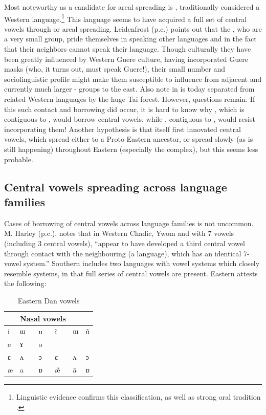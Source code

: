 \documentclass[output=paper,newtxmath,modfonts,nonflat,draft]{langsci/langscibook}
\begin{document}
Most noteworthy as a candidate for areal spreading is , traditionally considered a Western  language.\footnote{Linguistic evidence confirms this classification, as well as strong oral tradition \citep{centredetraduction2013}.} This language seems to have acquired a full set of central vowels through  or areal spreading.  Leidenfrost (p.c.) points out that the , who are a very small group, pride themselves in speaking other languages and in the fact that their neighbors cannot speak their language.  Though culturally they have been greatly influenced by Western Guere culture, having incorporated Guere masks (who, it turns out, must speak Guere!), their small number and sociolinguistic profile might make them susceptible to influence from adjacent and currently much larger -  groups to the east. Also note in   is today separated from related Western languages by the huge Tai forest. However, questions remain. If this such contact and borrowing did occur, it is hard to know why , which is contiguous to , would borrow central vowels, while , contiguous to , would resist incorporating them! Another hypothesis is that  itself first innovated central vowels, which spread either to a Proto Eastern  ancestor, or spread slowly (as is still happening) throughout Eastern  (especially the  complex), but this seems less probable.   

\subsection{Central vowels spreading across language families}\label{sec:zogbo:5.2} 

Cases of borrowing of central vowels across language families is not uncommon. M. Harley (p.c.), notes that in Western Chadic, Ywom and  with 7 vowels (including 3 central vowels), “appear to have developed a third central vowel through contact with the neighbouring  (a  language), which has an identical 7-vowel system.”  Southern  includes two  languages with vowel systems which closely resemble  systems, in that full series of central vowels are present. Eastern  attests the following: 

\begin{table}
\caption{Eastern Dan vowels \citep{Vydrine2009}}
\label{tab:zogbo:24}
\begin{tabular}{llp{2cm}lll}
\lsptoprule
\multicolumn{3}{l}{Oral vowels} &     \multicolumn{3}{l}{Nasal vowels}\\
\midrule
i & ɯ & u  &  ĩ & ɯ & ũ\\

e & ɤ & o\\

ɛ & ʌ & ɔ  &  ɛ & ʌ & ɔ\\

æ & a & ɒ  &  \~{æ} & ã & ɒ
\lspbottomrule
\end{tabular}
\end{table}
\end{document}
